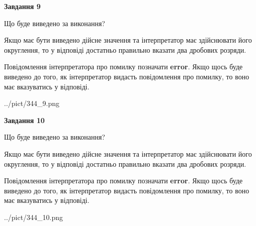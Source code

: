 \documentclass[12pt, ukrainian]{article}
\begin{document}
{\begin {Large}
{\begin {center}\textbf{Завдання 9}\end {center}}\par
Що буде виведено за виконання? \par

Якщо має бути виведено дійсне значення та інтерпретатор має здійснювати його округлення, 
то у відповіді достатньо правильно вказати два дробових розряди.

Повідомлення інтерпретатора про помилку позначати \textbf{error}.
Якщо щось буде виведено до того, як інтерпретатор видасть повідомлення про помилку, 
то воно має вказуватись у відповіді. \par

\begin{center}
	{../pict/344_9.png}
\end{center}
\newpage

{\begin {center}\textbf{Завдання 10}\end {center}}\par
Що буде виведено за виконання? \par

Якщо має бути виведено дійсне значення та інтерпретатор має здійснювати його округлення, 
то у відповіді достатньо правильно вказати два дробових розряди.

Повідомлення інтерпретатора про помилку позначати \textbf{error}.
Якщо щось буде виведено до того, як інтерпретатор видасть повідомлення про помилку, 
то воно має вказуватись у відповіді. \par

\begin{center}
	{../pict/344_10.png}
\end{center}
\newpage

\end {Large}}
\end{document}
